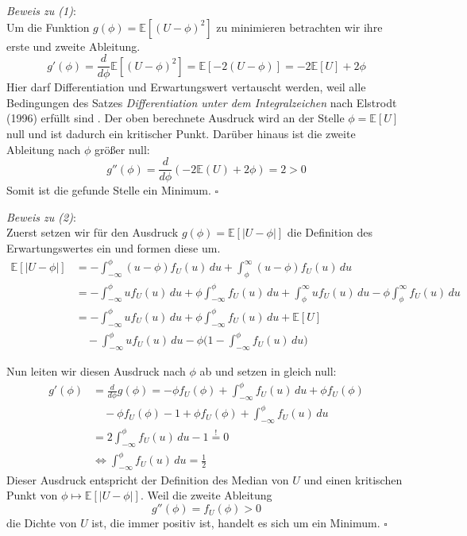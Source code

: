 \textit{Beweis zu (1)}: \\
Um die Funktion $g(\phi) = \mathbb{E}[(U - \phi)^2]$ zu minimieren betrachten wir ihre erste und zweite Ableitung.
$$ g'(\phi) = \frac{d}{d\phi}\mathbb{E}[(U-\phi)^2] = \mathbb{E}[-2(U-\phi)] = -2\mathbb{E}[U] + 2\phi$$
Hier darf Differentiation und Erwartungswert vertauscht werden, weil alle Bedingungen des Satzes \textit{Differentiation unter dem Integralzeichen} 
nach Elstrodt (1996) erf\"ullt sind \cite[Kapitel 4, Satz 5.7]{elstrodt}.
Der oben berechnete Ausdruck wird an der Stelle $\phi = \mathbb{E}[U]$ null und ist dadurch ein kritischer Punkt. Dar\"uber hinaus ist die zweite 
Ableitung nach $\phi$ gr\"o{\ss}er null:
$$g''(\phi) = \frac{d}{d\phi}(-2\mathbb{E}(U)+2\phi) = 2 > 0$$
Somit ist die gefunde Stelle ein Minimum. $\square$


\textit{Beweis zu (2)}: \\
Zuerst setzen wir f\"ur den Ausdruck $g(\phi) = \mathbb{E}[|U-\phi|]$ die Definition des Erwartungswertes ein und formen diese um.
\begin{equation*}
\begin{split}
  \mathbb{E}[|U-\phi|]  & = -\int_{-\infty}^{\phi}(u-\phi)f_U(u)  \,du + \int_{\phi}^{\infty}(u-\phi)f_U(u)  \,du \\\
 & = - \int_{-\infty}^{\phi}uf_U(u)  \,du + \phi \int_{-\infty}^{\phi}f_U(u)  \,du + \int_{\phi}^{\infty}uf_U(u)  \,du -\phi \int_{\phi}^{\infty}f_U(u)  \,du \\\
 & = - \int_{-\infty}^{\phi}uf_U(u) \,du + \phi \int_{-\infty}^{\phi}f_U(u) \,du + \mathbb{E}[U] \\\
 & \quad - \int_{-\infty}^{\phi}uf_U(u) \,du - \phi \bigl(1 - \int_{-\infty}^{\phi}f_U(u) \,du \bigr)
\end{split}
\end{equation*}

Nun leiten wir diesen Ausdruck nach $\phi$ ab und setzen in gleich null:
\begin{equation*}
  \begin{split}
    g'(\phi) & = \frac{d}{d\phi}g(\phi) = -\phi f_U(\phi) + \int_{-\infty}^{\phi}f_U(u) \,du + \phi f_U(\phi) \\\
    & \quad - \phi f_U(\phi) - 1 + \phi f_U(\phi) + \int_{-\infty}^{\phi}f_U(u) \,du \\\
    & = 2\int_{-\infty}^{\phi}f_U(u) \,du - 1 \overset{!}{=} 0 \\\
    & \Leftrightarrow \int_{-\infty}^{\phi}f_U(u) \,du = \frac{1}{2}
  \end{split}
\end{equation*}
Dieser Ausdruck entspricht der Definition des Median von $U$ und einen kritischen Punkt von $\phi \mapsto \mathbb{E}[|U - \phi|]$. Weil die zweite Ableitung 
$$ g''(\phi) = f_U(\phi) > 0 $$
die Dichte von $U$ ist, die immer positiv ist, handelt es sich um ein Minimum. $\square$



